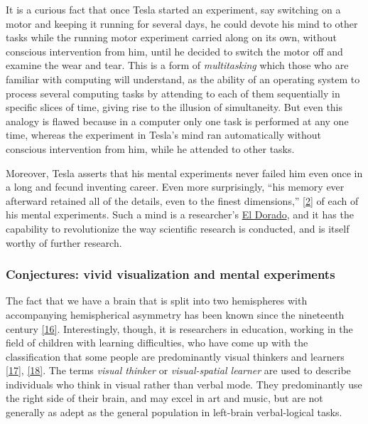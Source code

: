 \documentclass[
  a4paper,
]{article}
\begin{document}
It is a curious fact that once Tesla started an experiment, say
switching on a motor and keeping it running for several days, he could
devote his mind to other tasks while the running motor experiment
carried along on its own, without conscious intervention from him, until
he decided to switch the motor off and examine the wear and tear. This
is a form of \emph{multitasking} which those who are familiar with
computing will understand, as the ability of an operating system to
process several computing tasks by attending to each of them
sequentially in specific slices of time, giving rise to the illusion of
simultaneity. But even this analogy is flawed because in a computer only
one task is performed at any one time, whereas the experiment in Tesla's
mind ran automatically without conscious intervention from him, while he
attended to other tasks.

Moreover, Tesla asserts that his mental experiments never failed him
even once in a long and fecund inventing career. Even more surprisingly,
``his memory ever afterward retained all of the details, even to the
finest dimensions,'' \protect\hyperlink{ref-oneill80}{{[}2{]}} of each
of his mental experiments. Such a mind is a researcher's
\href{https://www.thefreedictionary.com/El+dorado}{El Dorado}, and it
has the capability to revolutionize the way scientific research is
conducted, and is itself worthy of further research.

\hypertarget{conjectures-vivid-visualization-and-mental-experiments}{%
\subsubsection{Conjectures: vivid visualization and mental
experiments}\label{conjectures-vivid-visualization-and-mental-experiments}}

The fact that we have a brain that is split into two hemispheres with
accompanying hemispherical asymmetry has been known since the nineteenth
century \protect\hyperlink{ref-springer89}{{[}16{]}}. Interestingly,
though, it is researchers in education, working in the field of children
with learning difficulties, who have come up with the classification
that some people are predominantly visual thinkers and learners
\protect\hyperlink{ref-silver02}{{[}17{]}},
\protect\hyperlink{ref-west91}{{[}18{]}}. The terms \emph{visual
thinker} or \emph{visual-spatial learner} are used to describe
individuals who think in visual rather than verbal mode. They
predominantly use the right side of their brain, and may excel in art
and music, but are not generally as adept as the general population in
left-brain verbal-logical tasks.
\end{document}

